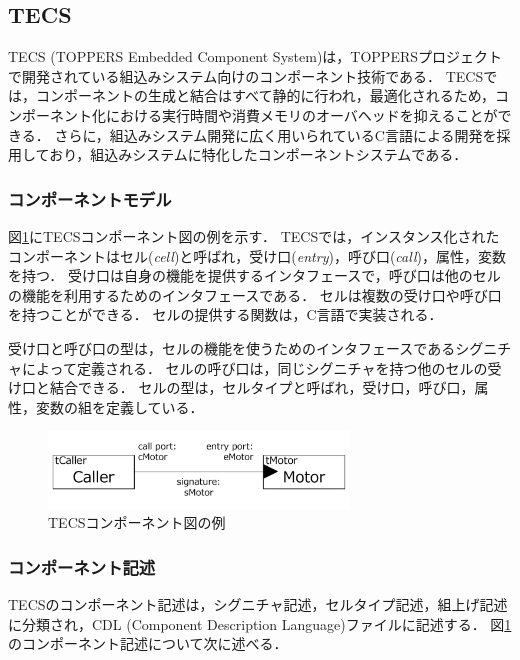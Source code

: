 \documentclass[submit,techrep]{ipsj_v2/UTF8/ipsj}
\begin{document}
\subsection{TECS}

TECS (TOPPERS Embedded Component System)は，TOPPERSプロジェクト\cite{url:TOPPERS}で開発されている組込みシステム向けのコンポーネント技術である．
TECSでは，コンポーネントの生成と結合はすべて静的に行われ，最適化されるため，コンポーネント化における実行時間や消費メモリのオーバヘッドを抑えることができる．
さらに，組込みシステム開発に広く用いられているC言語による開発を採用しており，組込みシステムに特化したコンポーネントシステムである．

\vspace{3mm}
\subsubsection{コンポーネントモデル}

図\ref{fig:component}にTECSコンポーネント図の例を示す．
TECSでは，インスタンス化されたコンポーネントはセル({\it cell})と呼ばれ，受け口({\it entry})，呼び口({\it call})，属性，変数を持つ．
受け口は自身の機能を提供するインタフェースで，呼び口は他のセルの機能を利用するためのインタフェースである．
セルは複数の受け口や呼び口を持つことができる．
セルの提供する関数は，C言語で実装される．

受け口と呼び口の型は，セルの機能を使うためのインタフェースであるシグニチャによって定義される．
セルの呼び口は，同じシグニチャを持つ他のセルの受け口と結合できる．
セルの型は，セルタイプと呼ばれ，受け口，呼び口，属性，変数の組を定義している．

\begin{figure}[t]
    \centering
    \includegraphics[width=8cm,clip]{figure/component_diagram.pdf}
    \caption{TECSコンポーネント図の例}
    \label{fig:component}
\end{figure}

\vspace{3mm}
\subsubsection{コンポーネント記述}
TECSのコンポーネント記述は，シグニチャ記述，セルタイプ記述，組上げ記述に分類され，CDL (Component Description Language)ファイルに記述する．
図\ref{fig:component}のコンポーネント記述について次に述べる．
\end{document}
